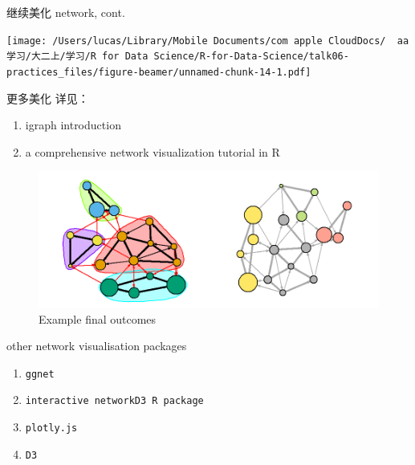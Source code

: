 \documentclass[ignorenonframetext,]{beamer}
\newenvironment{Shaded}{\begin{snugshade}}{\end{snugshade}}
\newcommand{\DecValTok}[1]{\textcolor[rgb]{0.00,0.00,0.81}{#1}}
\newcommand{\FunctionTok}[1]{\textcolor[rgb]{0.13,0.29,0.53}{\textbf{#1}}}
\newcommand{\NormalTok}[1]{#1}
\newcommand{\OtherTok}[1]{\textcolor[rgb]{0.56,0.35,0.01}{#1}}
\newcommand{\SpecialCharTok}[1]{\textcolor[rgb]{0.81,0.36,0.00}{\textbf{#1}}}
\newcommand{\StringTok}[1]{\textcolor[rgb]{0.31,0.60,0.02}{#1}}
\providecommand{\tightlist}{%
  \setlength{\itemsep}{0pt}\setlength{\parskip}{0pt}}
\newcommand\FontSmall{\fontsize{7}{8}\selectfont}
\begin{document}
\begin{frame}[fragile]{继续美化 network, cont.}
\protect\hypertarget{ux7ee7ux7eedux7f8eux5316-network-cont.}{}
\FontSmall

\begin{Shaded}
\end{Shaded}

\texttt{[image: /Users/lucas/Library/Mobile Documents/com~apple~CloudDocs/~~aa学习/大二上/学习/R for Data Science/R-for-Data-Science/talk06-practices\_files/figure-beamer/unnamed-chunk-14-1.pdf]}
\end{frame}

\begin{frame}{更多美化}
\protect\hypertarget{ux66f4ux591aux7f8eux5316}{}
详见：

\begin{enumerate}
\tightlist
\item
  igraph introduction
\item
  a comprehensive network visualization tutorial in R
\end{enumerate}

\begin{figure}
\centering
\includegraphics[width=\textwidth,height=0.4\textheight]{images/talk06/igraph_example.png}
\caption{Example final outcomes}
\end{figure}
\end{frame}

\begin{frame}[fragile]{other network visualisation packages}
\protect\hypertarget{other-network-visualisation-packages}{}
\begin{enumerate}
\tightlist
\item
  \texttt{ggnet}
\item
  \texttt{interactive\ networkD3\ R\ package}
\item
  \texttt{plotly.js}
\item
  \texttt{D3}
\end{enumerate}
\end{frame}
\end{document}
